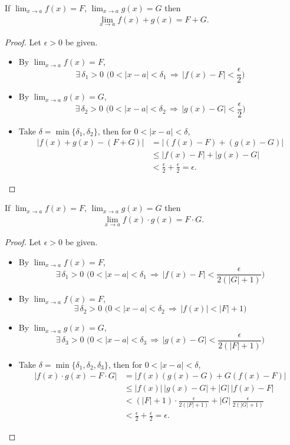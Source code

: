 \begin{theorem}
If $\lim_{x\to a}f(x) = F$, $\lim_{x\to a}g(x) = G$ then
\begin{align*}
\lim_{x\to a} f(x) + g(x) = F + G.
\end{align*}
\end{theorem}
\begin{proof}
Let $\epsilon > 0$ be given.
\begin{itemize}
\item By $\lim_{x\to a}f(x) = F$, $$\exists\,\delta_1 > 0\,\,\Big(0 < |x - a| < \delta_1\,\Longrightarrow\,|f(x) - F| < \frac{\epsilon}{2}\Big)$$
\item By $\lim_{x\to a}g(x) = G$, $$\exists\,\delta_2 > 0\,\,\Big(0 < |x - a| < \delta_2\,\Longrightarrow\,|g(x) - G| < \frac{\epsilon}{2}\Big)$$
\item Take $\delta = \min\{\delta_1, \delta_2\}$, then for $ 0 < |x - a| < \delta$,
\begin{align*}
|f(x) + g(x) - (F + G)| &= |(f(x) - F) + (g(x) - G)| \\
&\leqslant |f(x) - F| + |g(x) - G| \\
&< \frac{\epsilon}{2} + \frac{\epsilon}{2} = \epsilon.
\end{align*}
\end{itemize}
\end{proof}
\begin{theorem}
If $\lim_{x\to a}f(x) = F$, $\lim_{x\to a}g(x) = G$ then
\begin{align*}
\lim_{x\to a} f(x)\cdot g(x) = F\cdot G.
\end{align*}
\end{theorem}
\begin{proof}
Let $\epsilon > 0$ be given.
\begin{itemize}
\item By $\lim_{x\to a}f(x) = F$, $$\exists\,\delta_1 > 0\,\,\Big(0 < |x - a| < \delta_1\,\Longrightarrow\,|f(x) - F| < \frac{\epsilon}{2(|G| + 1)}\Big)$$
\item By $\lim_{x\to a}f(x) = F$, $$\exists\,\delta_2 > 0\,\,\Big(0 < |x - a| < \delta_2\,\Longrightarrow\,|f(x)| < |F| + 1\Big)$$
\item By $\lim_{x\to a}g(x) = G$, $$\exists\,\delta_3 > 0\,\,\Big(0 < |x - a| < \delta_3\,\Longrightarrow\,|g(x) - G| < \frac{\epsilon}{2(|F| + 1)}\Big)$$
\item Take $\delta = \min\{\delta_1, \delta_2, \delta_3\}$, then for $ 0 < |x - a| < \delta$,
\begin{align*}
|f(x)\cdot g(x) - F\cdot G| &= |f(x)(g(x) - G) + G(f(x) - F)| \\
&\leqslant |f(x)|\,|g(x) - G| + |G|\,|f(x) - F|\\
&< (|F| + 1)\cdot\frac{\epsilon}{2(|F| + 1)} + |G|\,\frac{\epsilon}{2(|G| + 1)}\\
&< \frac{\epsilon}{2} + \frac{\epsilon}{2} = \epsilon.
\end{align*}
\end{itemize}
\end{proof}
